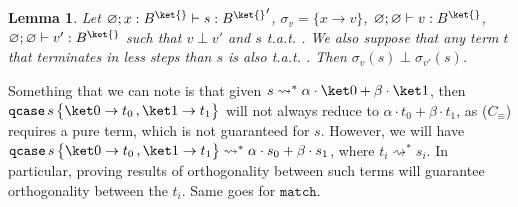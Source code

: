 \documentclass[10pt,a4paper]{article}
\newcommand{\bvar}{B}
\newcommand\bkvar{\bvar^{\ket{}}}
\newcommand{\bkvarb}{{\bkvar}}
\newcommand{\textqcase}{\ensuremath{\mathtt{qcase}}}
\newcommand{\textmatch}{\ensuremath{\mathtt{match}}}
\newcommand{\zket}{\ket 0}
\newcommand{\oket}{\ket 1}
\newcommand{\qcasebase}[2]{
  \textqcase\,#1\left\{\! \begin{aligned} #2 \end{aligned}\right\}
}
\newcommand{\qcase}[3]{
  \qcasebase {#1} {\zket \to #2\,, \oket \to #3}
}
\newcommand{\qcasedefault}[1]{\ensuremath{\qcase{#1}{t_0}{t_1}}}
\newcommand{\equivcontext}{\ensuremath{C_\equiv}}
\newcommand{\vartyping}[2]{#1 : #2}
\newcommand{\typing}[4]{
  \ifx&#1&\varnothing \else #1\fi; 
  \ifx&#2&\varnothing \else #2\fi 
  \vdash {#3} : #4
}
\newcommand{\closedtyping}[2]{\typing{}{}{#1}{#2}}
\newcommand{\subarrow}{\to}
\newcommand{\reduces}{\rightsquigarrow}
\newcommand{\sreduces}{\reduces^*}
\newtheorem{lemma}[theorem]{Lemma}
\begin{document}
\begin{lemma}\label{lem:subred-can-ortho}
  Let $\typing {} {\vartyping x \bkvar} s \bkvarb'$, $\sigma_v = \{x
  \subarrow v\}$,
  $\closedtyping v \bkvar$, $\closedtyping {v'} \bkvar$ such that $v
  \perp v'$ and $s$ t.a.t. .
  We also suppose that any term $t$ that terminates in less
  steps than $s$ is also t.a.t. .
  Then $\sigma_v(s) \perp \sigma_{v'}(s)$.
\end{lemma}

Something that we can note is that given $s \sreduces \alpha \cdot
\zket + \beta \cdot \oket$,
then $\qcasedefault s$ will not always reduce to $\alpha \cdot t_0 +
\beta \cdot t_1$,
as ($\equivcontext$) requires a pure term, which is not guaranteed for $s$.
However, we will have $\qcasedefault s \sreduces \alpha \cdot s_0 +
\beta \cdot s_1$,
where $t_i \sreduces s_i$. In particular, proving results of orthogonality
between such terms will guarantee orthogonality between the $t_i$.
Same goes for \textmatch{}.
\end{document}
